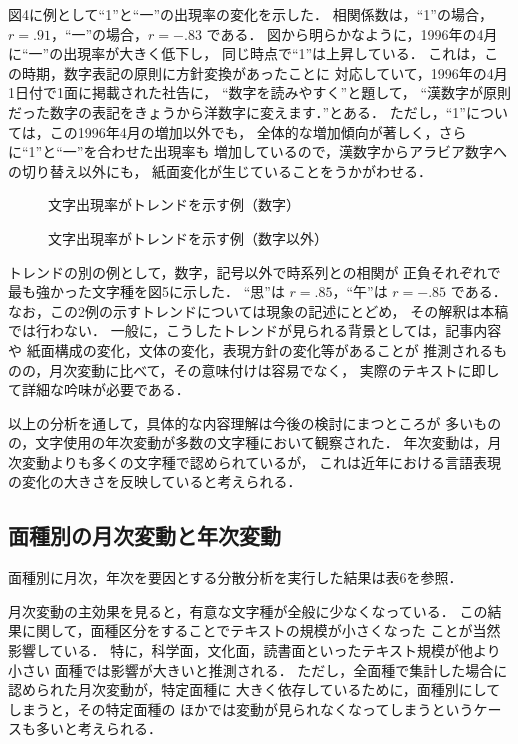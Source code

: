   図4に例として“1”と“一”の出現率の変化を示した．
相関係数は，“1”の場合， $r=.91$，“一”の場合，$r=-.83$ である．
図から明らかなように，1996年の4月に“一”の出現率が大きく低下し，
同じ時点で“1”は上昇している．
これは，この時期，数字表記の原則に方針変換があったことに
対応していて，1996年の4月1日付で1面に掲載された社告に，
“数字を読みやすく”と題して，
“漢数字が原則だった数字の表記をきょうから洋数字に変えます．”とある．
ただし，“1”については，この1996年4月の増加以外でも，
全体的な増加傾向が著しく，さらに“1”と“一”を合わせた出現率も
増加しているので，漢数字からアラビア数字への切り替え以外にも，
紙面変化が生じていることをうかがわせる．
\begin{figure}[htb]  
\begin{center}
\end{center}
\caption{文字出現率がトレンドを示す例（数字）}
\label{図4}
\end{figure}

\begin{figure}[htb]  
\begin{center}
\end{center}
\caption{文字出現率がトレンドを示す例（数字以外）}
\label{図5}
\end{figure}

  トレンドの別の例として，数字，記号以外で時系列との相関が
正負それぞれで最も強かった文字種を図5に示した．
“思”は $r=.85$，“午”は $r=-.85$ である．
なお，この2例の示すトレンドについては現象の記述にとどめ，
その解釈は本稿では行わない．
一般に，こうしたトレンドが見られる背景としては，記事内容や
紙面構成の変化，文体の変化，表現方針の変化等があることが
推測されるものの，月次変動に比べて，その意味付けは容易でなく，
実際のテキストに即して詳細な吟味が必要である．

  以上の分析を通して，具体的な内容理解は今後の検討にまつところが
多いものの，文字使用の年次変動が多数の文字種において観察された．
年次変動は，月次変動よりも多くの文字種で認められているが，
これは近年における言語表現の変化の大きさを反映していると考えられる．


\subsection{面種別の月次変動と年次変動}

  面種別に月次，年次を要因とする分散分析を実行した結果は表6を参照．


  月次変動の主効果を見ると，有意な文字種が全般に少なくなっている．
この結果に関して，面種区分をすることでテキストの規模が小さくなった
ことが当然影響している．
特に，科学面，文化面，読書面といったテキスト規模が他より小さい
面種では影響が大きいと推測される．
ただし，全面種で集計した場合に認められた月次変動が，特定面種に
大きく依存しているために，面種別にしてしまうと，その特定面種の
ほかでは変動が見られなくなってしまうというケースも多いと考えられる．

